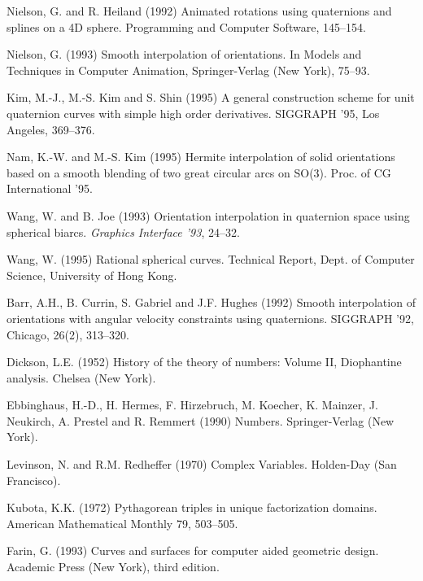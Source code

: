 Nielson, G. and R. Heiland (1992)
Animated rotations using quaternions and splines on a 4D sphere.
Programming and Computer Software, 145--154.

Nielson, G. (1993)
Smooth interpolation of orientations.
In Models and Techniques in Computer Animation, Springer-Verlag (New York),
75--93.

Kim, M.-J., M.-S. Kim and S. Shin (1995)
A general construction scheme for unit quaternion curves with simple
high order derivatives.
SIGGRAPH '95, Los Angeles, 369--376. 

Nam, K.-W. and M.-S. Kim (1995)
Hermite interpolation of solid orientations based on a smooth blending
of two great circular arcs on SO(3).
Proc. of CG International '95.

Wang, W. and B. Joe (1993)
Orientation interpolation in quaternion space using spherical biarcs.
{\em Graphics Interface '93}, 24--32.

Wang, W. (1995) 
Rational spherical curves.  Technical Report, Dept. of Computer Science,
University of Hong Kong.

Barr, A.H., B. Currin, S. Gabriel and J.F. Hughes (1992)
Smooth interpolation of orientations with angular velocity
constraints using quaternions.  SIGGRAPH '92, Chicago, 26(2), 313--320.

Dickson, L.E. (1952) History of the theory of numbers: Volume II,
Diophantine analysis.  Chelsea (New York).

Ebbinghaus, H.-D., H. Hermes, F. Hirzebruch, M. Koecher, K. Mainzer,
J. Neukirch, A. Prestel and R. Remmert (1990)
Numbers.
Springer-Verlag (New York).

Levinson, N. and R.M. Redheffer (1970)
Complex Variables.
Holden-Day (San Francisco).

Kubota, K.K. (1972) Pythagorean triples in unique factorization domains.
American Mathematical Monthly 79, 503--505.

Farin, G. (1993) Curves and surfaces for computer aided geometric design.
Academic Press (New York), third edition.

